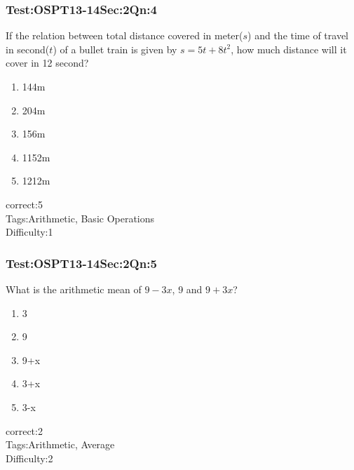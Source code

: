 \documentclass[]{beamer}
\begin{document}
    \begin{frame}
	    \frametitle{Test:OSPT13-14\hspace{2mm}Sec:2\hspace{2mm}Qn:4}
	   	If the relation between total distance covered in meter($s$) and the time of travel in second($t$) of a bullet train is given by $s=5t+8t^2$, how much distance will it cover in 12 second?
	   \begin{enumerate}
	        \item
	           144m
	        \item
	           204m
	        \item
	           156m
	        \item
	            1152m
	        \item
	           1212m
	    \end{enumerate}
	    correct:5\\   
	    Tags:Arithmetic, Basic Operations \\
	    Difficulty:1   \\
    \end{frame}    
    \begin{frame}
	    \frametitle{Test:OSPT13-14\hspace{2mm}Sec:2\hspace{2mm}Qn:5}
	    What is the arithmetic mean of $9-3x$, 9 and $9+3x$?
	   \begin{enumerate}
	        \item
	           3
	        \item
	            9
	        \item
	           9+x
	        \item
	            3+x
	        \item
	           3-x
	    \end{enumerate}
	    correct:2\\   
	    Tags:Arithmetic, Average\\
	    Difficulty:2   \\
    \end{frame}    
\end{document}
